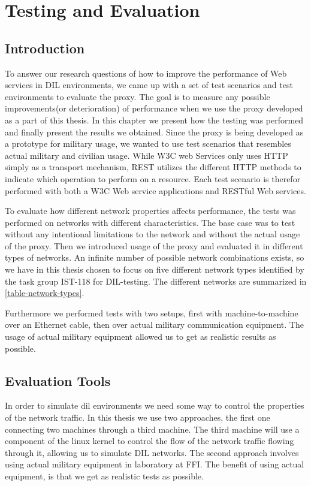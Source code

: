 \chapter{Testing and Evaluation}



\section{Introduction}

To answer our research questions of how to improve the performance of Web
services in DIL environments, we came up with a set of test scenarios and test
environments to evaluate the proxy. The goal is to measure any possible
improvements(or deterioration) of performance when we use the proxy developed as
a part of this thesis. In this chapter we present how the testing was performed
and finally present the results we obtained. Since the proxy is being developed
as a prototype for military usage, we wanted to use test scenarios that
resembles actual military and civilian usage.  While W3C web Services only uses
HTTP simply as a transport mechanism, REST utilizes the different HTTP methods to
indicate which operation to perform on a resource. Each test scenario is
therefor performed with both a W3C Web service applications and RESTful Web
services.

To evaluate how different network properties affects performance, the tests
was performed on networks with different characteristics. The base case was to
test without any intentional limitations to the network and without the actual
usage of the proxy. Then we introduced usage of the proxy and evaluated it in
different types of networks. An infinite number of possible network
combinations exists, so we have in this thesis chosen to focus on five
different network types identified by the task group IST-118 for DIL-testing.
The different networks are summarized in \cref{table-network-types}.

Furthermore we performed tests with two setups, first with machine-to-machine
over an Ethernet cable, then over actual military communication equipment. The
usage of actual military equipment allowed us to get as realistic results as
possible.


\section{Evaluation Tools}

In order to simulate \gls{dil} environments we need some way to control the
properties of the network traffic. In this thesis we use two approaches, the
first one connecting two machines through a third machine. The third machine
will use a component of the linux kernel to control the flow of the network
traffic flowing through it, allowing us to simulate DIL networks. The second
approach involves using actual military equipment in laboratory at FFI. The
benefit of using actual equipment, is that we get as realistic tests as
possible.

